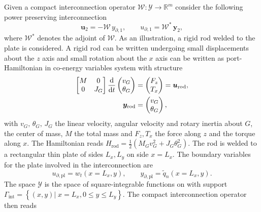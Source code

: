 \documentclass[letterpaper, 10 pt, conference]{ieeeconf}
\begin{document}
Given a compact interconnection operator $\mathcal{W}: \mathscr{Y} \rightarrow \mathbb{R}^m$ consider the following power preserving interconnection
\begin{equation}
\label{eq:int_inf}
\bm{u}_2 = -\mathcal{W} \, y_{\partial, 1},  \qquad u_{\partial, 1} = \mathcal{W}^* \, \bm{y}_2,
\end{equation}
where $\mathcal{W}^*$ denotes the adjoint of $\mathcal{W}$. As an illustration, a rigid rod welded to the plate is considered. A rigid rod can be written undergoing small displacements about the $z$ axis and small rotation about the $x$ axis can be written as port-Hamiltonian in co-energy variables system with structure
\begin{equation}
\begin{aligned}
\begin{bmatrix}
M & 0 \\
0   & J_G \\
\end{bmatrix} 
\displaystyle \diff{}{t}
\begin{pmatrix}
v_G \\ \theta_G \\
\end{pmatrix} & = \begin{pmatrix}
F_z \\ T_x \\
\end{pmatrix} = \bm{u}_{\text{rod}}\vspace{1mm}, \\
\bm{y}_{\text{rod}} &= \begin{pmatrix}
v_G \\ \theta_{G} \\
\end{pmatrix},
\end{aligned}
\end{equation}
with $v_G, \, \theta_{G}, \, J_G$ the linear velocity, angular velocity and rotary inertia about $G$, the center of mass, $M$ the total mass  and $F_z, T_x$ the force along $z$ and the torque along $x$. The Hamiltonian reads $H_{\text{rod}}  = \frac{1}{2} \left(M_G v_G^2 + J_G \theta_{G}^2 \right)$. The rod is welded to a rectangular thin plate of sides $L_x, L_y$ on side $x = L_x$. The boundary variables for the plate involved in the interconnection are 
\[u_{\partial, \text{pl}} = w_t(x = L_x, y),  \qquad  y_{\partial, \text{pl}} = \widetilde{q}_n(x = L_x, y).
\]
The space $\mathscr{Y}$ is the space of square-integrable functions on with support $\Gamma_{\text{int}} = \left\{ (x,y) \vert \; x=L_x, 0 \le y \le L_y  \right\}$. The compact interconnection operator then reads
\end{document}

